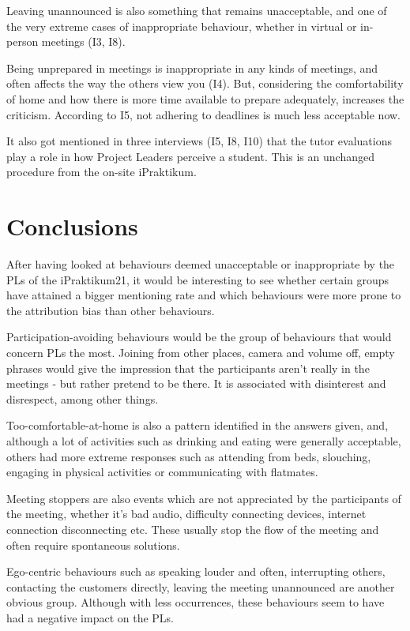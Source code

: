 Leaving unannounced is also something that remains unacceptable, and one of the very extreme cases of inappropriate behaviour, whether in virtual or in-person meetings (I3, I8). 

Being unprepared in meetings is inappropriate in any kinds of meetings, and often affects the way the others view you (I4). But, considering the comfortability of home and how there is more time available to prepare adequately, increases the criticism. According to I5, not adhering to deadlines is much less acceptable now.

It also got mentioned in three interviews (I5, I8, I10) that the tutor evaluations play a role in how Project Leaders perceive a student. This is an unchanged procedure from the on-site iPraktikum. 

\section{Conclusions}\label{Analysis}

After having looked at behaviours deemed unacceptable or inappropriate by the PLs of the iPraktikum21, it would be interesting to see whether certain groups have attained a bigger mentioning rate and which behaviours were more prone to the attribution bias than other behaviours.

Participation-avoiding behaviours would be the group of behaviours that would concern PLs the most. Joining from other places, camera and volume off, empty phrases would give the impression that the participants aren't really in the meetings - but rather pretend to be there. It is associated with disinterest and disrespect, among other things. 

Too-comfortable-at-home is also a pattern identified in the answers given, and, although a lot of activities such as drinking and eating were generally acceptable, others had more extreme responses such as attending from beds, slouching, engaging in physical activities or communicating with flatmates.

Meeting stoppers are also events which are not appreciated by the participants of the meeting, whether it's bad audio, difficulty connecting devices, internet connection disconnecting etc. These usually stop the flow of the meeting and often require spontaneous solutions.

Ego-centric behaviours such as speaking louder and often, interrupting others, contacting the customers directly, leaving the meeting unannounced are another obvious group. Although with less occurrences, these behaviours seem to have had a negative impact on the PLs.

